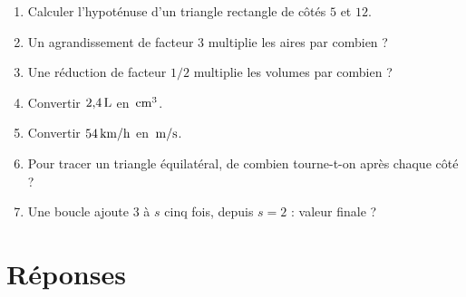 \documentclass[11pt,a4paper,oneside]{book}
\begin{document}
\begin{enumerate}
\item Calculer l'hypoténuse d'un triangle rectangle de côtés $5$ et $12$.
\item Un agrandissement de facteur $3$ multiplie les aires par combien ?
\item Une réduction de facteur $1/2$ multiplie les volumes par combien ?
\item Convertir $2{,}4\,\mathrm{L}$ en $\,\mathrm{cm^3}$.
\item Convertir $54\,\mathrm{km/h}$ en $\,\mathrm{m/s}$.
\item Pour tracer un triangle équilatéral, de combien tourne-t-on après chaque côté ?
\item Une boucle ajoute $3$ à $s$ cinq fois, depuis $s=2$ : valeur finale ?
\end{enumerate}
\section{Réponses}
\end{document}
